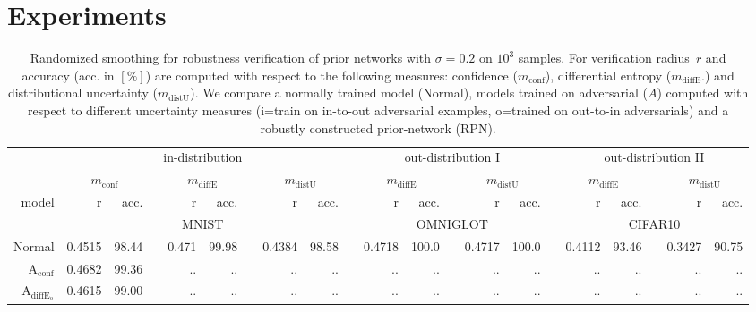 
\section{Experiments}



\begin{table}[ht]
	\centering
	\caption{Randomized smoothing for robustness verification of prior networks with $\sigma=0.2$ on $10^3$ samples. For verification radius~$r$ and accuracy (acc. in $[\%]$) are computed with respect to the following measures: confidence ($m_{\mathrm{conf}}$), differential entropy ($m_{\mathrm{diffE}}$.) and distributional uncertainty ($m_{\mathrm{distU}}$). We compare a normally trained model (Normal), models trained on adversarial ($A$) computed with respect to different uncertainty measures (i=train on in-to-out adversarial examples, o=trained on out-to-in adversarials) and a robustly constructed prior-network (RPN).}
	\begin{tiny}
		\begin{tabular}{@{}rrrcrrcrrcrrcrrcrrcrr@{}}
			\toprule
			& \multicolumn{8}{c}{in-distribution} &  & \multicolumn{5}{c}{out-distribution I} &   & \multicolumn{5}{c}{out-distribution II} \\
			\cmidrule{2-9} \cmidrule{11-15} \cmidrule{17-21}
			& \multicolumn{2}{c}{$m_{\mathrm{conf}}$} &   & \multicolumn{2}{c}{$m_{\mathrm{diffE}}$} &   & \multicolumn{2}{c}{$m_{\mathrm{distU}}$} &   
			& \multicolumn{2}{c}{$m_{\mathrm{diffE}}$} &   & \multicolumn{2}{c}{$m_{\mathrm{distU}}$} & 
			& \multicolumn{2}{c}{$m_{\mathrm{diffE}}$} &   & \multicolumn{2}{c}{$m_{\mathrm{distU}}$} \\
			\cmidrule{2-3}  \cmidrule{5-6} \cmidrule{8-9} \cmidrule{11-12}  \cmidrule{14-15} \cmidrule{17-18} \cmidrule{20-21}
			model & r & acc. & & r & acc. &  & r & acc. & & r & acc. & & r & acc. & & r & acc. & & r & acc. \\
			\midrule
			& \multicolumn{8}{c}{MNIST} & & \multicolumn{5}{c}{OMNIGLOT} & & \multicolumn{5}{c}{CIFAR10} \\
			Normal                            & 0.4515 & 98.44 & & 0.471 & 99.98 & & 0.4384 & 98.58 & & 0.4718 & 100.0 & & 0.4717 & 100.0 & & 0.4112 & 93.46 & & 0.3427 & 90.75 \\
			$\mathrm{A}_{\mathrm{conf}}$       & 0.4682 & 99.36 & & .. & .. & & .. & .. & & .. & .. & & .. & .. & & .. & .. & & .. & .. \\
			$\mathrm{A}_{\mathrm{diffE_{o}}}$  & 0.4615 & 99.00 & & .. & .. & & .. & .. & & .. & .. & & .. & .. & & .. & .. & & .. & .. \\

\end{tabular}
\end{tiny}
\end{table}
